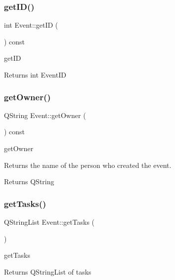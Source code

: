 \subsubsection{\texorpdfstring{get\+I\+D()}{getID()}}
{\footnotesize\ttfamily int Event\+::get\+ID (\begin{DoxyParamCaption}{ }\end{DoxyParamCaption}) const}



get\+ID 

\begin{DoxyReturn}{Returns}
int Event\+ID 
\end{DoxyReturn}
\mbox{\label{class_event_ab7e1dc08bd691aaf95ad994afdea6d2b}} 
\subsubsection{\texorpdfstring{get\+Owner()}{getOwner()}}
{\footnotesize\ttfamily Q\+String Event\+::get\+Owner (\begin{DoxyParamCaption}{ }\end{DoxyParamCaption}) const}



get\+Owner 

Returns the name of the person who created the event. \begin{DoxyReturn}{Returns}
Q\+String 
\end{DoxyReturn}
\mbox{\label{class_event_afd035786dd05f97c7a820878444306f6}} 
\subsubsection{\texorpdfstring{get\+Tasks()}{getTasks()}}
{\footnotesize\ttfamily Q\+String\+List Event\+::get\+Tasks (\begin{DoxyParamCaption}{ }\end{DoxyParamCaption})}



get\+Tasks 

\begin{DoxyReturn}{Returns}
Q\+String\+List of tasks 
\end{DoxyReturn}
\mbox{\label{class_event_ae105da8497f73e20c687060c5837e6f8}} 
